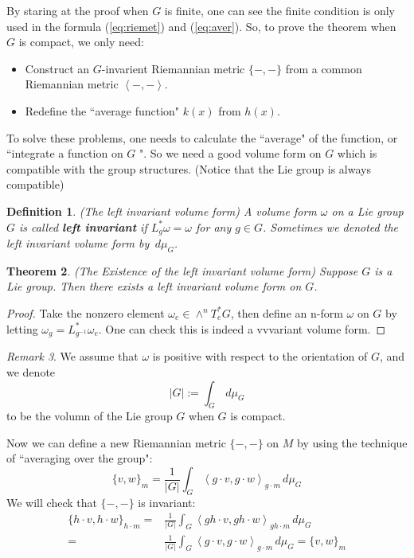 \documentclass[reqno,11pt]{amsart}
\numberwithin{equation}{section}
\theoremstyle{plain}
\newtheorem{theorem}{Theorem}[section]
\newtheorem{defn}[theorem]{Definition}
\theoremstyle{plain}
\numberwithin{equation}{section}
\theoremstyle{remark}
\newtheorem{remark}[theorem]{Remark}
\begin{document}
By staring at the proof when $G$ is finite, one can see the finite condition is only used in the formula (\ref{eq:riemet}) and (\ref{eq:aver}). So, to prove the theorem when $G$ is compact, we only need:
\begin{itemize}
	\item  Construct an $G$-invarient Riemannian metric $\{-,-\}$ from a common Riemannian metric
	$\left<-,-\right>$.
	\item Redefine the ``average function" $k(x)$ from $h(x)$.
\end{itemize}
To solve these problems, one needs to calculate the ``average" of the function, or ``integrate a function on $G$ ". So we need a good volume form on $G$ which is compatible with the group structures. (Notice that the Lie group is always compatible)
\begin{defn}(The left invariant volume form)
	A volume form $\omega$ on a Lie group $G$ is called \textbf{left invariant} if $L_g^*\omega=\omega$ for any $g \in G$.
	Sometimes we denoted the left invariant volume form by $\,d\mu_G$.
\end{defn}
\begin{theorem}(The Existence of the left invariant volume form)
	Suppose $G$ is a Lie group. Then there exists a left invariant volume form on $G$.
\end{theorem}
\begin{proof}
	Take the nonzero element $\omega_e \in \wedge^nT_e^*G$, then define an n-form $\omega$ on $G$ by letting $\omega_g= L_{g^{-1}}^*\omega_e$. One can check this is indeed a vvvariant volume form.
\end{proof}
\begin{remark}
	We assume that $\omega$ is positive with respect to the orientation of $G$, and we denote
	$$|G|:=\int_G \,d\mu_G$$
	to be the volumn of the Lie group $G$ when $G$ is compact.
\end{remark}
Now we can define a new Riemannian metric $\{-,-\}$ on $M$ by using the technique of ``averaging over the group":
\begin{equation}
\{v,w\}_m=\frac{1}{|G|}\int_G \left<g \cdot v,g\cdot w\right>_{g\cdot m}\,d\mu_G
\label{eq:riemet2}
\end{equation}
We will check that $\{-,-\}$ is invariant:
\begin{equation*}
\begin{aligned}
\{h \cdot v,h \cdot w\}_{h \cdot m}=&\frac{1}{|G|}\int_G \left<gh \cdot v,gh\cdot w\right>_{gh\cdot m}\,d\mu_G\\
=&\frac{1}{|G|}\int_G \left<g \cdot v,g\cdot w\right>_{g\cdot m}\,d\mu_G=\{v,w\}_{m}
\end{aligned}
\end{equation*}
\end{document}
